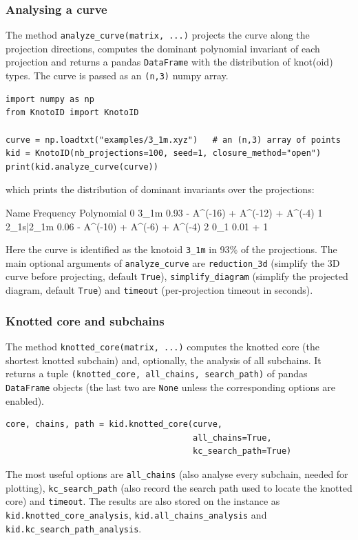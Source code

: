 \subsubsection{Analysing a curve}
The method \lstinline{analyze_curve(matrix, ...)} projects the curve along the projection directions, computes the dominant polynomial invariant of each projection and returns a {\ttfamily pandas} \lstinline{DataFrame} with the distribution of knot(oid) types. The curve is passed as an \lstinline{(n,3)} {\ttfamily numpy} array.
\begin{lstlisting}
import numpy as np
from KnotoID import KnotoID

curve = np.loadtxt("examples/3_1m.xyz")   # an (n,3) array of points
kid = KnotoID(nb_projections=100, seed=1, closure_method="open")
print(kid.analyze_curve(curve))
\end{lstlisting}
which prints the distribution of dominant invariants over the projections:
\begin{lstlistingsmall}
        Name  Frequency                    Polynomial
0       3_1m       0.93  - A^(-16) + A^(-12) + A^(-4)
1  2_1s|2_1m       0.06   - A^(-10) + A^(-6) + A^(-4)
2        0_1       0.01                           + 1
\end{lstlistingsmall}
Here the curve is identified as the knotoid \lstinline{3_1m} in 93\% of the projections. The main optional arguments of \lstinline{analyze_curve} are \lstinline{reduction_3d} (simplify the 3D curve before projecting, default \lstinline{True}), \lstinline{simplify_diagram} (simplify the projected diagram, default \lstinline{True}) and \lstinline{timeout} (per-projection timeout in seconds).

\subsubsection{\label{sec:python:knottedcore}Knotted core and subchains}
The method \lstinline{knotted_core(matrix, ...)} computes the knotted core (the shortest knotted subchain) and, optionally, the analysis of all subchains. It returns a tuple \lstinline{(knotted_core, all_chains, search_path)} of {\ttfamily pandas} \lstinline{DataFrame} objects (the last two are \lstinline{None} unless the corresponding options are enabled).
\begin{lstlisting}
core, chains, path = kid.knotted_core(curve,
                                      all_chains=True,
                                      kc_search_path=True)
\end{lstlisting}
The most useful options are \lstinline{all_chains} (also analyse every subchain, needed for plotting), \lstinline{kc_search_path} (also record the search path used to locate the knotted core) and \lstinline{timeout}. The results are also stored on the instance as \lstinline{kid.knotted_core_analysis}, \lstinline{kid.all_chains_analysis} and \lstinline{kid.kc_search_path_analysis}.

